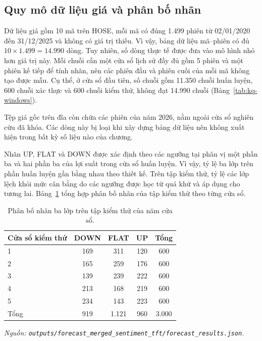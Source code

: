 \documentclass[12pt, a4paper, oneside]{report}
\begin{document}
\subsection{Quy mô dữ liệu giá và phân bố nhãn}

Dữ liệu giá gồm 10 mã trên HOSE, mỗi mã có đúng 1.499 phiên từ 02/01/2020 đến 31/12/2025
và không có giá trị thiếu. Vì vậy, bảng dữ liệu mã--phiên có đủ
$10 \times 1.499 = 14.990$ dòng. Tuy nhiên, số dòng thực tế được đưa vào mô hình nhỏ hơn
giá trị này. Mỗi chuỗi cần một cửa sổ lịch sử đầy đủ gồm 5 phiên và một phiên kế tiếp để
tính nhãn, nên các phiên đầu và phiên cuối của mỗi mã không tạo được mẫu. Cụ thể, ở cửa sổ
đầu tiên, số chuỗi gồm 11.350 chuỗi huấn luyện, 600 chuỗi xác thực và 600 chuỗi kiểm thử,
không đạt 14.990 chuỗi (Bảng~\ref{tab:kq-windows}).

Tệp giá gốc trên đĩa còn chứa các phiên của năm 2026, nằm ngoài cửa sổ nghiên cứu đã khóa.
Các dòng này bị loại khi xây dựng bảng dữ liệu nên không xuất hiện trong bất kỳ số liệu nào
của chương.

Nhãn UP, FLAT và DOWN được xác định theo các ngưỡng tại phân vị một phần ba và hai phần ba
của lợi suất trong cửa sổ huấn luyện. Vì vậy, tỷ lệ ba lớp trên phần huấn luyện gần bằng
nhau theo thiết kế. Trên tập kiểm thử, tỷ lệ các lớp lệch khỏi mức cân bằng do các ngưỡng
được học từ quá khứ và áp dụng cho tương lai. Bảng~\ref{tab:kq-price-stats} tổng hợp phân bố
nhãn của tập kiểm thử theo từng cửa sổ.

\begin{table}[H]
  \centering
  \caption{Phân bố nhãn ba lớp trên tập kiểm thử của năm cửa sổ.}
  \label{tab:kq-price-stats}
  \begin{tabular}{p{4.5cm} c c c c}
    \toprule
    Cửa sổ kiểm thử & DOWN & FLAT & UP & Tổng \\
    \midrule
    1 & 169 & 311 & 120 & 600 \\
    2 & 165 & 259 & 176 & 600 \\
    3 & 139 & 239 & 222 & 600 \\
    4 & 213 & 168 & 219 & 600 \\
    5 & 234 & 143 & 223 & 600 \\
    \midrule
    Tổng & 919 & 1.121 & 960 & 3.000 \\
    \bottomrule
  \end{tabular}
\noindent\textit{Nguồn: \texttt{outputs/forecast\_merged\_sentiment\_tft/forecast\_results.json}.}
\end{table}
\end{document}
